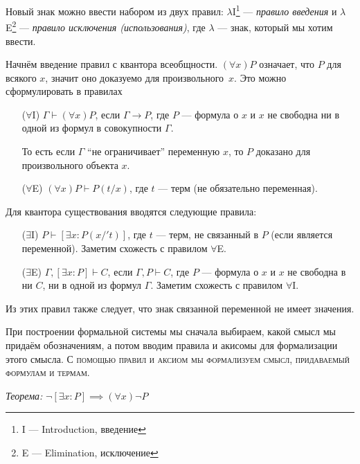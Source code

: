 \newcommand\Aii{$\forall$I}
\newcommand\Aee{$\forall$E}
\newcommand\Eii{$\exists$I}
\newcommand\Eee{$\exists$E}

Новый знак можно ввести набором из двух правил:
$\lambda$I\footnote{I --- Introduction, введение} --- {\it правило введения}
и $\lambda$E\footnote{E --- Elimination, исключение} --- {\it правило
исключения (использования)}, где $\lambda$ --- знак, который мы хотим ввести.

Начнём введение правил с квантора всеобщности. $(\forall x)P$ означает, что $P$ для
всякого $x$, значит оно доказуемо для произвольного~$x$. Это можно сформулировать
в правилах
\begin{enumerate}
	\item[(\Aii{})]{}$\Gamma\vdash(\forall x)P$, если ${\Gamma\to P}$, где
	$P$ --- формула о $x$ и $x$ не свободна ни в одной из формул в совокупности $\Gamma$.

	То есть если $\Gamma$ ``не ограничивает'' переменную $x$,
	то $P$ доказано для произвольного объекта $x$.

	\item[(\Aee{})]{}$(\forall x)P\vdash P(t/x)$, где $t$ --- терм
	(не обязательно переменная).
\end{enumerate}

Для квантора существования вводятся следующие правила:
\begin{enumerate}
	\item[(\Eii{})]${P\vdash [\exists x:P(x/'t)]}$, где $t$ --- терм,
	не связанный в $P$ (если является переменной).
	Заметим схожесть с правилом $\forall$E.

	\item[(\Eee{})]${\Gamma, [\exists x:P]\vdash C}$, если $\Gamma, P\vdash C$,
	где $P$ --- формула о $x$ и $x$ не свободна в ни $C$, ни в одной из формул $\Gamma$.
	Заметим схожесть с правилом $\forall$I.
\end{enumerate}

Из этих правил также следует, что знак связанной переменной не имеет значения.

При построении формальной системы мы сначала
выбираем, какой смысл мы придаём обозначениям, а потом вводим
правила и акисомы для формализации этого смысла.
\textsc{С помощью правил и аксиом мы формализуем смысл, придаваемый формулам и термам.}

\vspace{1em}
{\it Теорема:} $\lnot [\exists x:P]\implies  (\forall x)\lnot P$

